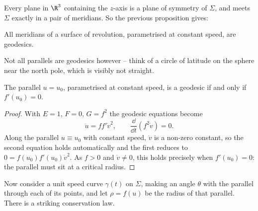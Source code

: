 Every plane in $\R^3$ containing the $z$-axis is a plane of symmetry of $\Sigma$, and meets $\Sigma$ exactly in a pair of meridians. So the previous proposition gives:

\begin{corollary}
    All meridians of a surface of revolution, parametrised at constant speed, are geodesics.
\end{corollary}

Not all parallels are geodesics however -- think of a circle of latitude on the sphere near the north pole, which is visibly not straight.

\begin{lemma}
    The parallel $u = u_0$, parametrised at constant speed, is a geodesic if and only if $f'(u_0) = 0$.
\end{lemma}
\begin{proof}
    With $E = 1$, $F = 0$, $G = f^2$ the geodesic equations become
    $$
    \ddot u = f f' \dot v^2, \qquad \frac{\dd}{\dd t}\left(f^2\dot v\right) = 0.
    $$
    Along the parallel $u \equiv u_0$ with constant speed, $\dot v$ is a non-zero constant, so the second equation holds automatically and the first reduces to $0 = f(u_0)f'(u_0)\dot v^2$. As $f > 0$ and $\dot v \neq 0$, this holds precisely when $f'(u_0) = 0$: the parallel must sit at a critical radius.
\end{proof}

Now consider a unit speed curve $\gamma(t)$ on $\Sigma$, making an angle $\theta$ with the parallel through each of its points, and let $\rho = f(u)$ be the radius of that parallel. There is a striking conservation law.

\begin{center}
\end{center}

